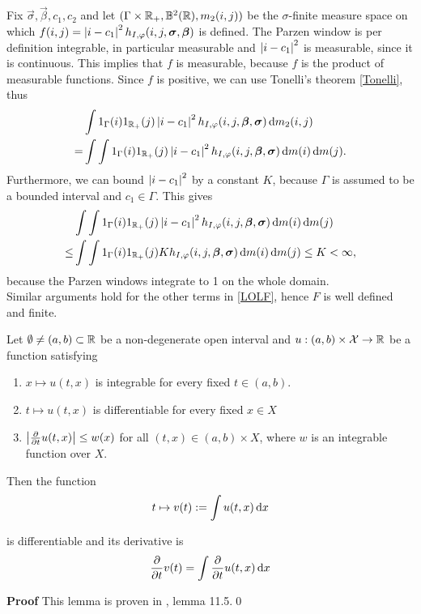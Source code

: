 Fix $\vec{\sigma}, \vec{\beta}, c_1, c_2$ and let $(\Gamma\times \mathbb R_+,\mathbb{B}^2(\mathbb R),m_2(i,j))$ be the $\sigma$-finite measure space on which $f(i,j) = \left| {i-c_1} \right|^2h_{I,\varphi}(i,j,\boldsymbol{\sigma} ,\boldsymbol{\beta} )$ is defined. The Parzen window is per definition integrable, in particular measurable and $\left| {i-c_1} \right|^2$ is measurable, since it is continuous. This implies that $f$ is measurable, because $f$ is the product of measurable functions. Since $f$ is positive, we can use Tonelli's theorem \eqref{Tonelli}, thus
\begin{equation}
  \begin{split}
    &\int 1_\Gamma(i) 1_{\mathbb R_+}(j) \left| {i-c_1} \right|^2h_{I,\varphi}(i,j,\boldsymbol{\beta} ,\boldsymbol{\sigma} )\,{\rm d} m_2(i, j)\\
    = &\int\int 1_\Gamma(i) 1_{\mathbb R_+}(j) \left| {i-c_1} \right|^2h_{I,\varphi}(i,j,\boldsymbol{\beta} ,\boldsymbol{\sigma} )\,{\rm d} m(i) \,{\rm d} m(j).
  \end{split}
\end{equation}
Furthermore, we can bound $\left| {i-c_1} \right|^2$ by a constant $K$, because $\Gamma$ is assumed to be a bounded interval and $c_1\in\Gamma$. This gives
\begin{equation}
  \begin{split}
    &\int\int 1_\Gamma(i) 1_{\mathbb R_+}(j) \left| {i-c_1} \right|^2h_{I,\varphi}(i,j,\boldsymbol{\beta} ,\boldsymbol{\sigma} )\,{\rm d} m(i) \,{\rm d} m(j)\\
    \leq &\int\int 1_\Gamma(i) 1_{\mathbb R_+}(j) K h_{I,\varphi}(i,j,\boldsymbol{\beta} ,\boldsymbol{\sigma} )\,{\rm d} m(i) \,{\rm d} m(j) \leq K < \infty,
  \end{split}
\end{equation}
because the Parzen windows integrate to 1 on the whole domain.\\
Similar arguments hold for the other terms in \eqref{LOLF}, hence $F$ is well defined and finite.\\

\begin{lemma}\label{DiffLemma}
 Let $\emptyset \neq (a,b)\subset\mathbb R$ be a non-degenerate open interval and $u:(a,b)\times \mathcal{X}\to \mathbb R$ be a function satisfying
\begin{enumerate}
  \item $x\mapsto u(t,x)$ is integrable for every fixed $t\in(a,b)$.
  \item $t\mapsto u(t,x)$ is differentiable for every fixed $x\in X$
  \item $\left| {\frac{\partial}{\partial t} u(t,x)} \right|\leq w(x)$ for all $(t,x)\in (a,b)\times X$, where $w$ is an integrable function over $X$.
\end{enumerate}

Then the function 
\begin{equation}
  t\mapsto v(t):=\int u(t,x) \,{\rm d} x
\end{equation}

is differentiable and its derivative is
\begin{equation}
  \frac{\partial}{\partial t} v(t) = \int \frac{\partial}{\partial t} u(t,x) \,{\rm d} x
\end{equation}
\end{lemma}
\textbf{Proof} This lemma is proven in \cite[p.~92]{schilling.11}, lemma 11.5.\hfill\qed\\

